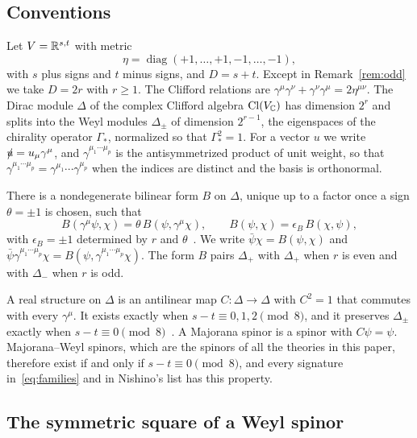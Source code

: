 \subsection{Conventions}

Let $V=\mathbb{R}^{s,t}$ with metric
\[
\eta=\operatorname{diag}(+1,\dots,+1,-1,\dots,-1),
\]
with $s$ plus signs and $t$ minus signs, and $D=s+t$. Except in Remark~\ref{rem:odd} we take $D=2r$ with $r\ge1$. The Clifford relations are $\gamma^\mu\gamma^\nu+\gamma^\nu\gamma^\mu=2\eta^{\mu\nu}$. The Dirac module $\Delta$ of the complex Clifford algebra $\operatorname{Cl}(V_{\mathbb{C}})$ has dimension $2^r$ and splits into the Weyl modules $\Delta_\pm$ of dimension $2^{r-1}$, the eigenspaces of the chirality operator $\Gamma_*$, normalized so that $\Gamma_*^2=1$. For a vector $u$ we write $\slashed{u}=u_\mu\gamma^\mu$, and $\gamma^{\mu_1\cdots\mu_p}$ is the antisymmetrized product of unit weight, so that $\gamma^{\mu_1\cdots\mu_p}=\allowbreak\gamma^{\mu_1}\cdots\gamma^{\mu_p}$ when the indices are distinct and the basis is orthonormal.

There is a nondegenerate bilinear form $B$ on $\Delta$, unique up to a factor once a sign $\theta=\pm1$ is chosen, such that
\begin{equation}
\label{eq:Bsym}
B(\gamma^\mu\psi,\chi)=\theta\,B(\psi,\gamma^\mu\chi),\qquad B(\psi,\chi)=\epsilon_B\,B(\chi,\psi),
\end{equation}
with $\epsilon_B=\pm1$ determined by $r$ and $\theta$~\cite{Deligne1999,VanProeyen1999,DAuriaFerraraLledoVaradarajan2001}. We write $\bar\psi\chi=B(\psi,\chi)$ and $\bar\psi\gamma^{\mu_1\cdots\mu_p}\chi=B(\psi,\gamma^{\mu_1\cdots\mu_p}\chi)$. The form $B$ pairs $\Delta_+$ with $\Delta_+$ when $r$ is even and with $\Delta_-$ when $r$ is odd.

A real structure on $\Delta$ is an antilinear map $C:\Delta\to\Delta$ with $C^2=1$ that commutes with every $\gamma^\mu$. It exists exactly when $s-t\equiv0,1,2\pmod 8$, and it preserves $\Delta_\pm$ exactly when $s-t\equiv0\pmod 8$~\cite{LawsonMichelsohn1989,Deligne1999,VanProeyen1999}. A Majorana spinor is a spinor with $C\psi=\psi$. Majorana--Weyl spinors, which are the spinors of all the theories in this paper, therefore exist if and only if $s-t\equiv 0\pmod 8$, and every signature in~\eqref{eq:families} and in Nishino's list has this property.

\subsection{The symmetric square of a Weyl spinor}

